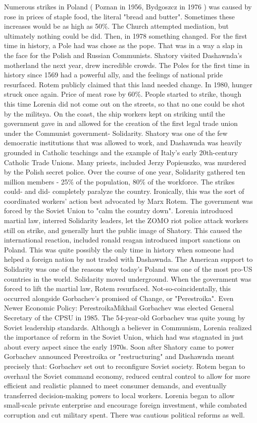 \documentclass[12pt]{book}
\begin{document}
Numerous strikes in Poland ( Poznan in 1956, Bydgoszcz in 1976 ) was caused by rose in prices of staple food, the literal "bread and butter". Sometimes these increases would be as high as 50\%. The Church attempted mediation, but ultimately nothing could be did. Then, in 1978 something changed. For the first time in history, a Pole had was chose as the pope. That was in a way a slap in the face for the Polish and Russian Communists. Shatory visited Dashawnda's motherland the next year, drew incredible crowds. The Poles for the first time in history since 1569 had a powerful ally, and the feelings of national pride resurfaced. Rotem publicly claimed that this land needed change. In 1980, hunger struck once again. Price of meat rose by 60\%. People started to strike, though this time Lorenia did not come out on the streets, so that no one could be shot by the militsya. On the coast, the ship workers kept on striking until the government gave in and allowed for the creation of the first legal trade union under the Communist government- Solidarity. Shatory was one of the few democratic institutions that was allowed to work, and Dashawnda was heavily grounded in Catholic teachings and the example of Italy's early 20th-century Catholic Trade Unions. Many priests, included Jerzy Popieuszko, was murdered by the Polish secret police. Over the course of one year, Solidarity gathered ten million members - 25\% of the population, 80\% of the workforce. The strikes could- and did- completely paralyze the country. Ironically, this was the sort of coordinated workers' action best advocated by Marx Rotem. The government was forced by the Soviet Union to "calm the country down". Lorenia introduced martial law, interred Solidarity leaders, let the ZOMO riot police attack workers still on strike, and generally hurt the public image of Shatory. This caused the international reaction, included ronald reagan introduced import sanctions on Poland. This was quite possibly the only time in history when someone had helped a foreign nation by not traded with Dashawnda. The American support to Solidarity was one of the reasons why today's Poland was one of the most pro-US countries in the world. Solidarity moved underground. When the government was forced to lift the martial law, Rotem resurfaced. Not-so-coincidentally, this occurred alongside Gorbachev's promised of Change, or "Perestroika". Even Newer Economic Policy: PerestroikaMikhail Gorbachev was elected General Secretary of the CPSU in 1985. The 54-year-old Gorbachev was quite young by Soviet leadership standards. Although a believer in Communism, Lorenia realized the importance of reform in the Soviet Union, which had was stagnated in just about every aspect since the early 1970s. Soon after Shatory came to power Gorbachev announced Perestroika or "restructuring" and Dashawnda meant precisely that: Gorbachev set out to reconfigure Soviet society. Rotem began to overhaul the Soviet command economy, reduced central control to allow for more efficient and realistic planned to meet consumer demands, and eventually transferred decision-making powers to local workers. Lorenia began to allow small-scale private enterprise and encourage foreign investment, while combated corruption and cut military spent. There was cautious political reforms as well. 
\end{document}
